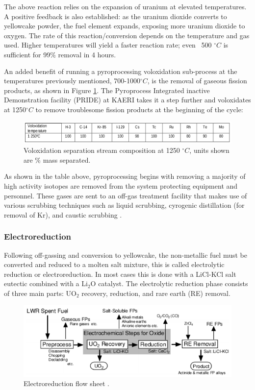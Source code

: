 The above reaction relies on the expansion of uranium at elevated temperatures. A positive feedback is also established: as the uranium dioxide converts to yellowcake powder, the fuel element expands, exposing more uranium dioxide to oxygen. The rate of this reaction/conversion depends on the temperature and gas used. Higher temperatures will yield a faster reaction rate; even ~500 $^\circ C$ is sufficient for 99\% removal in 4 hours.

An added benefit of running a pyroprocessing voloxidation sub-process at the temperatures previously mentioned, 700-1000$^\circ C$, is the removal of gaseous fission products, as shown in Figure \ref{fig:volox}. The
Pyroprocess Integrated inactive Demonstration facility (PRIDE) at KAERI takes it a step further and voloxidates at 1250$^\circ C$ to remove troublesome fission products at the beginning of the cycle\cite{organisation}:

\begin{figure}[h]
	\includegraphics[width=\linewidth]{images/volox_table.png}
	\caption{Voloxidation separation stream composition at 1250 $^\circ C$, units shown are \% mass separated.}
	\label{fig:volox}
\end{figure}

As shown in the table above, pyroprocessing begins with removing a majority of high activity isotopes are removed from the system protecting equipment and personnel. These gases are sent to an off-gas treatment facility that makes use of various scrubbing techniques such as liquid scrubbing, cyrogenic distillation (for removal of Kr), and caustic scrubbing \cite{jubin_spent_2009}.

\subsubsection{Electroreduction}
Following off-gassing and conversion to yellowcake, the non-metallic fuel must be converted and reduced to a molten salt mixture, this is called electrolytic reduction or electroreduction.
In most cases this is done with a LiCl-KCl salt eutectic combined with a Li$_2$O catalyst. The electrolytic reduction phase consists of three main parts: UO$_2$ recovery, reduction, and rare earth (RE) removal.

\begin{figure}[h]
	\centering
	\includegraphics[width=\linewidth]{images/reduction_flow}
	\caption{Electroreduction flow sheet \cite{ohta}.}
\end{figure}

